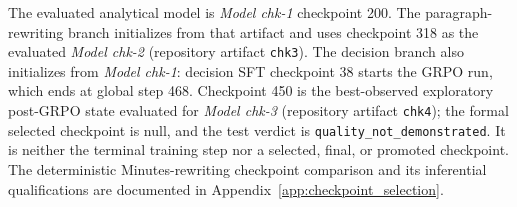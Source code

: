 The evaluated analytical model is \textit{Model chk-1} checkpoint 200. The
paragraph-rewriting branch initializes from that artifact and uses checkpoint
318 as the evaluated \textit{Model chk-2} (repository artifact \texttt{chk3}). The decision branch also initializes from
\textit{Model chk-1}: decision SFT checkpoint 38 starts the GRPO run, which
ends at global step 468. Checkpoint 450 is the best-observed exploratory
post-GRPO state evaluated for \textit{Model chk-3} (repository artifact
\texttt{chk4}); the formal selected checkpoint is null, and the test verdict is
\texttt{quality\_not\_demonstrated}. It is neither the terminal training step
nor a selected, final, or promoted checkpoint. The deterministic
Minutes-rewriting checkpoint comparison and its inferential qualifications are
documented in Appendix~\ref{app:checkpoint_selection}.
